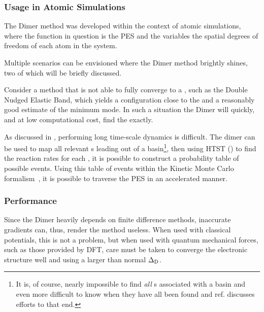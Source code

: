 \subsubsection{Usage in Atomic Simulations}
The Dimer method was developed within the context of atomic simulations, where the function in question is the PES and the variables the spatial degrees of freedom of each atom in the system.

Multiple scenarios can be envisioned where the Dimer method brightly shines, two of which will be briefly discussed.

\item Consider a method that is not able to fully converge to a , such as the Double Nudged Elastic Band, which yields a configuration close to the  and a reasonably good estimate of the minimum mode.
In such a situation the Dimer will quickly, and at low computational cost, find the  exactly.
~\cite{dneb-2004}
\item As discussed in , performing long time-scale dynamics is difficult.
The dimer can be used to map all relevant s leading out of a basin\footnote{It is, of course, nearly impossible to find \emph{all} s associated with a basin and even more difficult to know when they have all been found and ref. \cite{dimer-sampling-2011} discusses efforts to that end.}, then using HTST () to find the reaction rates for each , it is possible to construct a probability table of possible events.
Using this table of events within the Kinetic Monte Carlo formalism~\citemiss, it is possible to traverse the PES in an accelerated manner.
~\cite{akmc-2001}
\een

\subsubsection{Performance}
Since the Dimer heavily depends on finite difference methods, inaccurate gradients can, thus, render the method useless.
When used with classical potentials, this is not a problem, but when used with quantum mechanical forces, such as those provided by DFT, care must be taken to converge the electronic structure well and using a larger than normal $\Delta_\text{D}$\citemiss.
